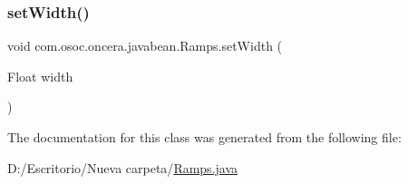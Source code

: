 \subsubsection{\texorpdfstring{setWidth()}{setWidth()}}
{\footnotesize\ttfamily void com.\+osoc.\+oncera.\+javabean.\+Ramps.\+set\+Width (\begin{DoxyParamCaption}\item[{Float}]{width }\end{DoxyParamCaption})}



The documentation for this class was generated from the following file\+:\begin{DoxyCompactItemize}
\item 
D\+:/\+Escritorio/\+Nueva carpeta/\mbox{\hyperlink{_ramps_8java}{Ramps.\+java}}\end{DoxyCompactItemize}
